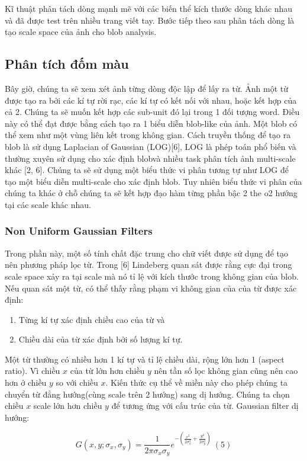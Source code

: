 \documentclass[a4paper]{article}
\begin{document}
Kĩ thuật phân tách dòng mạnh mẽ với các biến thể kích thước dòng khác nhau và đã được test trên nhiều trang viết tay. Bước tiếp theo sau phân tách dòng là tạo scale space của ảnh cho blob analysis.

\subsection{Phân tích đốm màu}
Bây giờ, chúng ta sẽ xem xét ảnh từng dòng độc lập để lấy ra từ. Ảnh một từ được tạo ra bởi các kí tự rời rạc, các kí tự có kết nối với nhau, hoặc kết hợp của cả 2. Chúng ta sẽ muốn kết hợp các sub-unit đó lại trong 1 đối tượng word. Điều này có thể đạt được bằng cách tạo ra 1 biểu diễn blob-like của ảnh. Một blob có thể xem như một vùng liên kết trong không gian. Cách truyền thống để tạo ra blob là sử dụng Laplacian of Gaussian (LOG)[6], LOG là phép toán phổ biến và thường xuyên sử dụng cho xác định blobvà nhiều task phân tích ảnh multi-scale khác [2, 6]. Chúng ta sẽ sử dụng một biểu thức vi phân tương tự như LOG để tạo một biểu diễn multi-scale cho xác định blob. Tuy nhiên biểu thức vi phân của chúng ta khác ở chỗ chúng ta sẽ kết hợp đạo hàm từng phần bậc 2 the o2 hướng tại các scale khác nhau.

\subsubsection*{Non Uniform Gaussian Filters}
Trong phần này, một số tính chất đặc trung cho chữ viết được sử dụng để tạo nên phương pháp lọc từ. Trong [6] Lindeberg quan sát được rằng cực đại trong scale space xảy ra tại scale mà nó tỉ lệ với kích thước trong không gian của blob. Nếu quan sát một từ, có thể thấy rằng phạm vi không gian của của từ được xác định:
\begin{enumerate}
    \item Từng kí tự xác định chiều cao của từ và
    \item Chiều dài của từ xác định bởi số lượng kí tự.
\end{enumerate}
Một từ thường có nhiều hơn 1 kí tự và tỉ lệ chiều dài, rộng lớn hơn 1 (aspect ratio). Vì chiều $x$  của từ lớn hơn chiều $y$ nên tần số lọc không gian cũng nên cao hơn ở chiều $y$ so với chiều $x$. Kiến thức cụ thể về miền này cho phép chúng ta chuyển từ đẳng hướng(cùng scale trên 2 hướng) sang dị hướng. Chúng ta chọn chiều $x$  scale lớn hơn chiều $y$ để tương ứng với cấu trúc của từ. Gaussian filter dị hướng:

\begin{equation}
    G(x, y; \sigma_x, \sigma_y) = \frac 1{2\pi \sigma_x\sigma_y} e^{-(\frac {x^2}{2\sigma_x^2}+ \frac {y^2}{2\sigma_y^2})}~ (5)
\end{equation}
\end{document}
